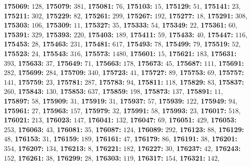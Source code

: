 \textsf{\bfseries 175069:} $128$, \textsf{\bfseries 175079:} $381$, \textsf{\bfseries 175081:} $76$, \textsf{\bfseries 175103:} $15$, \textsf{\bfseries 175129:} $51$, \textsf{\bfseries 175141:} $23$, \textsf{\bfseries 175211:} $302$, \textsf{\bfseries 175229:} $82$, \textsf{\bfseries 175261:} $299$, \textsf{\bfseries 175267:} $192$, \textsf{\bfseries 175277:} $18$, \textsf{\bfseries 175291:} $308$, \textsf{\bfseries 175303:} $106$, \textsf{\bfseries 175309:} $11$, \textsf{\bfseries 175327:} $35$, \textsf{\bfseries 175333:} $54$, \textsf{\bfseries 175349:} $22$, \textsf{\bfseries 175361:} $60$, \textsf{\bfseries 175391:} $329$, \textsf{\bfseries 175393:} $220$, \textsf{\bfseries 175403:} $189$, \textsf{\bfseries 175411:} $59$, \textsf{\bfseries 175433:} $40$, \textsf{\bfseries 175447:} $116$, \textsf{\bfseries 175453:} $28$, \textsf{\bfseries 175463:} $231$, \textsf{\bfseries 175481:} $617$, \textsf{\bfseries 175493:} $78$, \textsf{\bfseries 175499:} $79$, \textsf{\bfseries 175519:} $52$, \textsf{\bfseries 175523:} $24$, \textsf{\bfseries 175543:} $316$, \textsf{\bfseries 175573:} $1480$, \textsf{\bfseries 175601:} $15$, \textsf{\bfseries 175621:} $183$, \textsf{\bfseries 175631:} $393$, \textsf{\bfseries 175633:} $37$, \textsf{\bfseries 175649:} $71$, \textsf{\bfseries 175663:} $178$, \textsf{\bfseries 175673:} $45$, \textsf{\bfseries 175687:} $111$, \textsf{\bfseries 175691:} $282$, \textsf{\bfseries 175699:} $284$, \textsf{\bfseries 175709:} $340$, \textsf{\bfseries 175723:} $41$, \textsf{\bfseries 175727:} $89$, \textsf{\bfseries 175753:} $69$, \textsf{\bfseries 175757:} $141$, \textsf{\bfseries 175759:} $23$, \textsf{\bfseries 175781:} $287$, \textsf{\bfseries 175783:} $94$, \textsf{\bfseries 175811:} $118$, \textsf{\bfseries 175829:} $83$, \textsf{\bfseries 175837:} $260$, \textsf{\bfseries 175843:} $130$, \textsf{\bfseries 175853:} $637$, \textsf{\bfseries 175859:} $198$, \textsf{\bfseries 175873:} $137$, \textsf{\bfseries 175891:} $11$, \textsf{\bfseries 175897:} $58$, \textsf{\bfseries 175909:} $31$, \textsf{\bfseries 175919:} $31$, \textsf{\bfseries 175937:} $57$, \textsf{\bfseries 175939:} $122$, \textsf{\bfseries 175949:} $94$, \textsf{\bfseries 175961:} $27$, \textsf{\bfseries 175963:} $157$, \textsf{\bfseries 175979:} $32$, \textsf{\bfseries 175991:} $58$, \textsf{\bfseries 175993:} $23$, \textsf{\bfseries 176017:} $518$, \textsf{\bfseries 176021:} $213$, \textsf{\bfseries 176023:} $147$, \textsf{\bfseries 176041:} $132$, \textsf{\bfseries 176047:} $69$, \textsf{\bfseries 176051:} $429$, \textsf{\bfseries 176053:} $253$, \textsf{\bfseries 176063:} $43$, \textsf{\bfseries 176081:} $35$, \textsf{\bfseries 176087:} $124$, \textsf{\bfseries 176089:} $292$, \textsf{\bfseries 176123:} $88$, \textsf{\bfseries 176129:} $48$, \textsf{\bfseries 176153:} $31$, \textsf{\bfseries 176159:} $189$, \textsf{\bfseries 176161:} $47$, \textsf{\bfseries 176179:} $86$, \textsf{\bfseries 176191:} $38$, \textsf{\bfseries 176201:} $354$, \textsf{\bfseries 176207:} $134$, \textsf{\bfseries 176213:} $8$, \textsf{\bfseries 176221:} $182$, \textsf{\bfseries 176227:} $30$, \textsf{\bfseries 176237:} $42$, \textsf{\bfseries 176243:} $152$, \textsf{\bfseries 176261:} $38$, \textsf{\bfseries 176299:} $28$, \textsf{\bfseries 176303:} $119$, \textsf{\bfseries 176317:} $154$, \textsf{\bfseries 176321:} $142$, 
